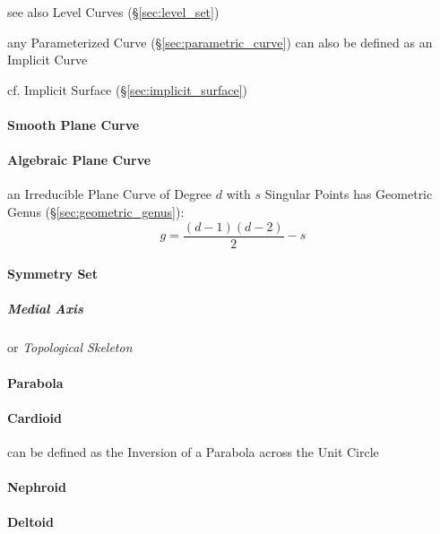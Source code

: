 see also Level Curves (\S\ref{sec:level_set})

any Parameterized Curve (\S\ref{sec:parametric_curve}) can also be defined as an
Implicit Curve

\fist cf. Implicit Surface (\S\ref{sec:implicit_surface})



\paragraph{Smooth Plane Curve}\label{sec:smooth_plane_curve}\hfill

\paragraph{Algebraic Plane Curve}\label{sec:algebraic_plane_curve}\hfill

an Irreducible Plane Curve of Degree $d$ with $s$ Singular Points has Geometric
Genus (\S\ref{sec:geometric_genus}):
\[
  g = \frac{(d-1)(d-2)}{2} - s
\]



\paragraph{Symmetry Set}\label{sec:symmetry_set}\hfill

\subparagraph{Medial Axis}\label{sec:medial_axis}\hfill

or \emph{Topological Skeleton}



\paragraph{Parabola}\label{sec:parabola}\hfill

\paragraph{Cardioid}\label{sec:cardioid}\hfill

can be defined as the Inversion of a Parabola across the Unit Circle

\paragraph{Nephroid}\label{sec:nephroid}\hfill

\paragraph{Deltoid}\label{sec:deltoid}\hfill

